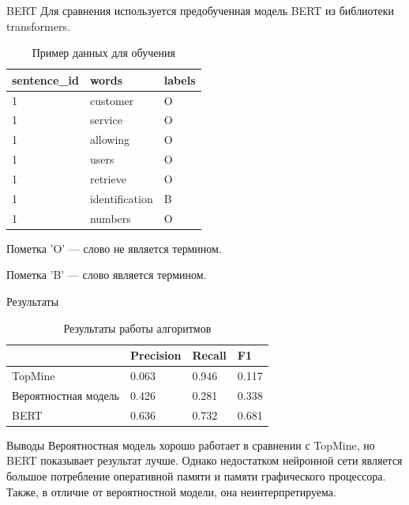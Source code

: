 \documentclass{beamer}
\begin{document}
\begin{frame}{BERT}
Для сравнения используется предобученная модель BERT из библиотеки transformers.
\begin{table}[]
\caption{Пример данных для обучения}
\begin{tabular}{|l|l|l|}
\hline
sentence\_id & words          & labels \\ \hline
1            & customer       & O      \\ \hline
1            & service        & O      \\ \hline
1            & allowing       & O      \\ \hline
1            & users          & O      \\ \hline
1            & retrieve       & O      \\ \hline
1            & identification & B      \\ \hline
1            & numbers        & O      \\ \hline
\end{tabular}
\end{table}
Пометка 'O' --- слово не является термином.

Пометка 'B' --- слово является термином.
\end{frame}

\begin{frame}{Результаты}
\begin{table}[ht]
    \caption{Результаты работы алгоритмов}
    \label{table:TopMine}
    \centering\medskip
    \begin{tabular}{|l|l|l|l|}
    \hline
        & Precision & Recall & F1 \\ \hline
        TopMine & 0.063 & 0.946 & 0.117 \\ \hline
        Вероятностная модель & 0.426 & 0.281 & 0.338 \\ \hline
        BERT & 0.636 & 0.732 & 0.681 \\
        \hline
    \end{tabular}
\end{table}
\begin{block}{Выводы}
Вероятностная модель хорошо работает в сравнении с TopMine, но BERT показывает результат лучше. Однако недостатком нейронной сети является большое потребление оперативной памяти и памяти графического процессора. Также, в отличие от вероятностной модели, она неинтерпретируема.
\end{block}
\end{frame}
\end{document}
